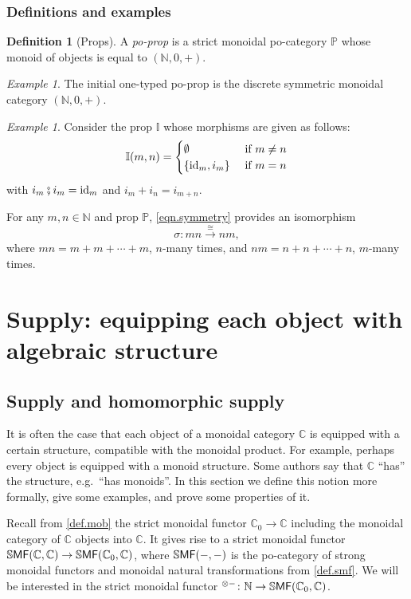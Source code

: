 \documentclass[11pt, oneside, article]{memoir}
\theoremstyle{plain}
\theoremstyle{definition}
\newtheorem{definition}[theorem]{Definition}
\theoremstyle{remark}
\newtheorem{example}[theorem]{Example}
\newcommand{\ccat}[1]{\mathbb{#1}}%
\newcommand{\Cat}[1]{{\mathsf{#1}}}%
\newcommand{\CCat}[1]{\mathbb{\StrLeft{#1}{1}}\Cat{\StrGobbleLeft{#1}{1}}}%
\DeclareMathOperator{\id}{id}
\newcommand{\tn}[1]{\textnormal{#1}}
\newcommand{\ssmf}{\CCat{SMF}}
\newcommand{\cc}{\mathbb{C}}
\newcommand{\nn}{\mathbb{N}}
\newcommand{\pp}{\mathbb{P}}
\newcommand{\mob}[1]{#1_0}
\newcommand{\cp}{\mathbin{\fatsemi}}
\newcommand{\To}[1]{\xrightarrow{#1}}
\begin{document}
\subsection{Definitions and examples}

\begin{definition}[Props]\label{def.props}
A \emph{po-prop} is a strict monoidal po-category $\pp$ whose monoid of objects is equal to $(\nn,0,+)$. 
\end{definition}

\begin{example}\label{ex.nat_prop}
The initial one-typed po-prop is the discrete symmetric monoidal category $(\nn,0,+)$.
\end{example}

\begin{example}\label{ex.involutions}
Consider the prop $\ccat{I}$ whose morphisms are given as follows:
\[
  \ccat{I}(m,n)=
  \begin{cases}
  	\emptyset&\tn{ if }m\neq n\\
		\{\id_m, i_m\}&\tn{ if }m=n
  \end{cases}
 \]
 with $i_m\cp i_m=\id_m$ and $i_m+i_n=i_{m+n}$. 
\end{example}

For any $m,n\in\nn$ and prop $\pp$, \cref{eqn.symmetry} provides an isomorphism
\[\sigma\colon mn\To{\cong}nm,\]
where $mn=m+m+\cdots+m$, $n$-many times, and $nm=n+n+\cdots+n$, $m$-many times.


\chapter{Supply: equipping each object with algebraic structure}

\section{Supply and homomorphic supply}

It is often the case that each object of a monoidal category $\cc$ is equipped with a certain structure, compatible with the monoidal product. For example, perhaps every object is equipped with a monoid structure. Some authors say that $\cc$ ``has'' the structure, e.g.\ ``has monoids''. In this section we define this notion more formally, give some examples, and prove some properties of it.

Recall from \cref{def.mob} the strict monoidal functor $\mob{\cc}\to\cc$ including the monoidal category of $\cc$ objects into $\cc$. It gives rise to a strict monoidal functor $\ssmf(\cc,\cc)\to\ssmf(\mob{\cc},\cc)$, where $\ssmf(-,-)$ is the po-category of strong monoidal functors and monoidal natural transformations from \cref{def.smf}. We will be interested in the strict monoidal functor $^{\otimes-}\colon\nn\to\ssmf(\mob{\cc},\cc)$.
\end{document}
